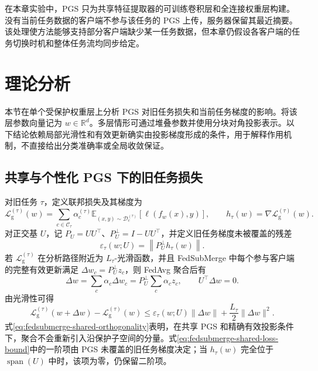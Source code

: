 在本章实验中，PGS 只为共享特征提取器的可训练卷积层和全连接权重层构建。没有当前任务数据的客户端不参与该任务的 PGS 上传，服务器保留其最近摘要。该处理使方法能够支持部分客户端缺少某一任务数据，但本章仍假设各客户端的任务切换时机和整体任务流均同步给定。

\section{理论分析}
\label{sec:fedsubmerge-theory}

本节在单个受保护权重层上分析 PGS 对旧任务损失和当前任务梯度的影响。将该层参数向量记为 $w\in\mathbb{R}^{d}$。多层情形可通过堆叠参数并使用分块对角投影表示。以下结论依赖局部光滑性和有效更新确实由投影梯度形成的条件，用于解释作用机制，不直接给出分类准确率或全局收敛保证。

\subsection{共享与个性化 PGS 下的旧任务损失}
\label{subsec:fedsubmerge-theory-loss}

对旧任务 $\tau$，定义联邦损失及其梯度为
\begin{equation}
\mathcal{L}_{\mathrm g}^{(\tau)}(w)
=
\sum_{c\in\mathcal{C}_{\tau}}
\alpha_c^{(\tau)}
\mathbb{E}_{(x,y)\sim\mathcal{D}_c^{(\tau)}}
\left[\ell(f_w(x),y)\right],
\qquad
h_{\tau}(w)=\nabla\mathcal{L}_{\mathrm g}^{(\tau)}(w).
\label{eq:fedsubmerge-old-task-loss}
\end{equation}
对正交基 $U$，记 $P_U=UU^{\top}$、$P_U^{\perp}=I-UU^{\top}$，并定义旧任务梯度未被覆盖的残差
\begin{equation}
\varepsilon_{\tau}(w;U)
=
\left\|P_U^{\perp}h_{\tau}(w)\right\|.
\label{eq:fedsubmerge-coverage-residual}
\end{equation}
若 $\mathcal{L}_{\mathrm g}^{(\tau)}$ 在分析路径附近为 $L_{\tau}$-光滑函数，并且 FedSubMerge 中每个参与客户端的完整有效更新满足
$\Delta w_c=P_U^{\perp}z_c$，则 FedAvg 聚合后有
\begin{equation}
\Delta w
=
\sum_c\alpha_c\Delta w_c
=
P_U^{\perp}\sum_c\alpha_c z_c,
\qquad
U^{\top}\Delta w=0.
\label{eq:fedsubmerge-shared-orthogonality}
\end{equation}
由光滑性可得
\begin{equation}
\mathcal{L}_{\mathrm g}^{(\tau)}(w+\Delta w)
-
\mathcal{L}_{\mathrm g}^{(\tau)}(w)
\leq
\varepsilon_{\tau}(w;U)\|\Delta w\|
+
\frac{L_{\tau}}{2}\|\Delta w\|^2.
\label{eq:fedsubmerge-shared-loss-bound}
\end{equation}
式\eqref{eq:fedsubmerge-shared-orthogonality}表明，在共享 PGS 和精确有效投影条件下，聚合不会重新引入沿保护子空间的分量。式\eqref{eq:fedsubmerge-shared-loss-bound}中的一阶项由 PGS 未覆盖的旧任务梯度决定；当 $h_{\tau}(w)$ 完全位于 $\operatorname{span}(U)$ 中时，该项为零，仍保留二阶项。

